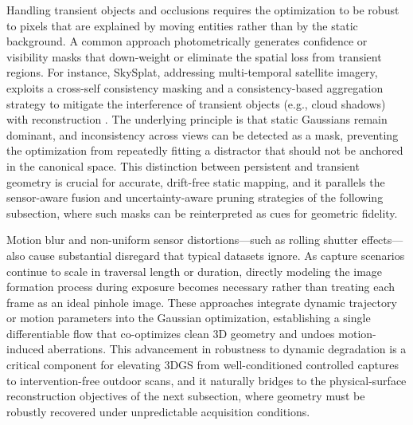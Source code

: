 \documentclass[11pt,a4paper]{article}
\begin{document}
Handling transient objects and occlusions requires the optimization to be robust to pixels that are explained by moving entities rather than by the static background. A common approach photometrically generates confidence or visibility masks that down-weight or eliminate the spatial loss from transient regions. For instance, SkySplat, addressing multi-temporal satellite imagery, exploits a cross-self consistency masking and a consistency-based aggregation strategy to mitigate the interference of transient objects (e.g., cloud shadows) with reconstruction \cite{arxiv:2508.09479v2}. The underlying principle is that static Gaussians remain dominant, and inconsistency across views can be detected as a mask, preventing the optimization from repeatedly fitting a distractor that should not be anchored in the canonical space. This distinction between persistent and transient geometry is crucial for accurate, drift-free static mapping, and it parallels the sensor-aware fusion and uncertainty-aware pruning strategies of the following subsection, where such masks can be reinterpreted as cues for geometric fidelity.

Motion blur and non-uniform sensor distortions---such as rolling shutter effects---also cause substantial disregard that typical datasets ignore. As capture scenarios continue to scale in traversal length or duration, directly modeling the image formation process during exposure becomes necessary rather than treating each frame as an ideal pinhole image. These approaches integrate dynamic trajectory or motion parameters into the Gaussian optimization, establishing a single differentiable flow that co-optimizes clean 3D geometry and undoes motion-induced aberrations. This advancement in robustness to dynamic degradation is a critical component for elevating 3DGS from well-conditioned controlled captures to intervention-free outdoor scans, and it naturally bridges to the physical-surface reconstruction objectives of the next subsection, where geometry must be robustly recovered under unpredictable acquisition conditions.
\end{document}
